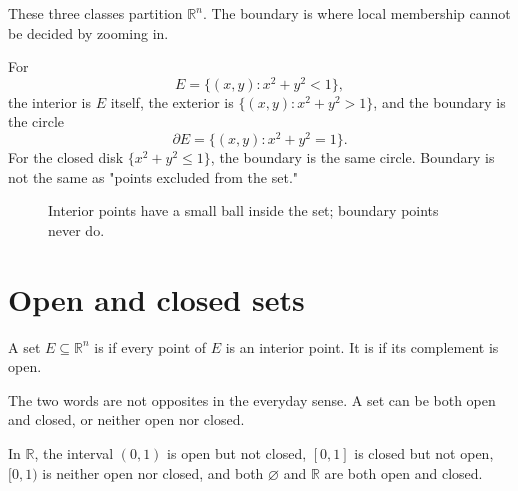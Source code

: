 These three classes partition \(\mathbb R^n\).  The boundary is where local membership cannot be decided by zooming in.

\begin{example}
For
\[
  E=\{(x,y):x^2+y^2<1\},
\]
the interior is \(E\) itself, the exterior is \(\{(x,y):x^2+y^2>1\}\), and the boundary is the circle
\[
  \partial E=\{(x,y):x^2+y^2=1\}.
\]
For the closed disk \(\{x^2+y^2\le1\}\), the boundary is the same circle.  Boundary is not the same as "points excluded from the set."
\end{example}

\begin{figure}[H]
\centering
{}
\caption{Interior points have a small ball inside the set; boundary points never do.}
\end{figure}

\section{Open and closed sets}

\begin{definition}
A set \(E\subseteq\mathbb R^n\) is  if every point of \(E\) is an interior point.  It is  if its complement is open.
\end{definition}

The two words are not opposites in the everyday sense.  A set can be both open and closed, or neither open nor closed.

\begin{example}
In \(\mathbb R\), the interval \((0,1)\) is open but not closed, \([0,1]\) is closed but not open, \([0,1)\) is neither open nor closed, and both \(\varnothing\) and \(\mathbb R\) are both open and closed.
\end{example}

